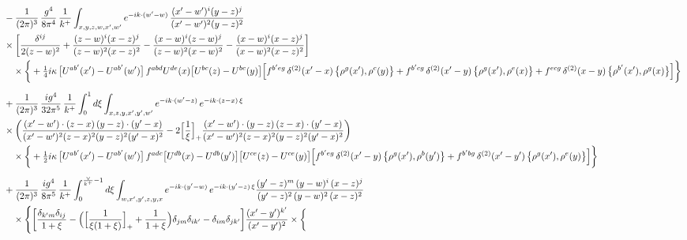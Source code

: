 \documentclass[10pt]{article}
\numberwithin{equation}{section}
\begin{document}
\begin{align}
&-\frac{1}{(2\pi)^{3}}\,\frac{g^{4}}{8\pi^{4}}\,\frac{1}{k^{+}}\int_{x,y,z,w,x^{\prime},w^{\prime}}e^{-ik\cdot(w^{\prime}-w)}\,\frac{(x^{\prime}-w^{\prime})^{i}(y-z)^{j}}{(x^{\prime}-w^{\prime})^{2}(y-z)^{2}}\notag\\
&\times\bigg[\frac{\delta^{ij}}{2(z-w)^{2}}+\frac{(z-w)^{i}(x-z)^{j}}{(z-w)^{2}(x-z)^{2}}-\frac{(x-w)^{i}(z-w)^{j}}{(z-w)^{2}(x-w)^{2}}-\frac{(x-w)^{i}(x-z)^{j}}{(x-w)^{2}(x-z)^{2}}\bigg]\notag\\
&\quad\times\bigg\{+\tfrac14 i\kappa\,\big[U^{ab^{\prime}}(x^{\prime})-U^{ab^{\prime}}(w^{\prime})\big]\,f^{abd}U^{de}(x)\big[U^{bc}(z)-U^{bc}(y)\big]\Big[f^{b^{\prime}eg}\,\delta^{(2)}(x^{\prime}-x)\,\big\{\rho^{g}(x^{\prime}),\rho^{c}(y)\big\}+f^{b^{\prime}cg}\,\delta^{(2)}(x^{\prime}-y)\,\big\{\rho^{g}(x^{\prime}),\rho^{e}(x)\big\}+f^{ecg}\,\delta^{(2)}(x-y)\,\big\{\rho^{b^{\prime}}(x^{\prime}),\rho^{g}(x)\big\}\Big]\bigg\}\notag\\[6pt]
&+\frac{1}{(2\pi)^{3}}\,\frac{ig^{4}}{32\pi^{5}}\,\frac{1}{k^{+}}\int_{0}^{1}d\xi\int_{x,z,y,x^{\prime},y^{\prime},w^{\prime}}e^{-ik\cdot(w^{\prime}-z)}\,e^{-ik\cdot(z-x)\,\xi}\notag\\
&\times\bigg(\frac{(x^{\prime}-w^{\prime})\cdot(z-x)\,(y-z)\cdot(y^{\prime}-x)}{(x^{\prime}-w^{\prime})^{2}(z-x)^{2}(y-z)^{2}(y^{\prime}-x)^{2}}-2\Big[\frac{1}{\xi}\Big]_{+}\frac{(x^{\prime}-w^{\prime})\cdot(y-z)\,(z-x)\cdot(y^{\prime}-x)}{(x^{\prime}-w^{\prime})^{2}(z-x)^{2}(y-z)^{2}(y^{\prime}-x)^{2}}\bigg)\notag\\
&\quad\times\bigg\{+\tfrac12 i\kappa\,\big[U^{ab^{\prime}}(x^{\prime})-U^{ab^{\prime}}(w^{\prime})\big]\,f^{adc}\big[U^{db}(x)-U^{db}(y^{\prime})\big]\big[U^{ce}(z)-U^{ce}(y)\big]\Big[f^{b^{\prime}eg}\,\delta^{(2)}(x^{\prime}-y)\,\big\{\rho^{g}(x^{\prime}),\rho^{b}(y^{\prime})\big\}+f^{b^{\prime}bg}\,\delta^{(2)}(x^{\prime}-y^{\prime})\,\big\{\rho^{g}(x^{\prime}),\rho^{e}(y)\big\}\Big]\bigg\}\notag\\[6pt]
&+\frac{1}{(2\pi)^{3}}\,\frac{ig^{4}}{8\pi^{5}}\,\frac{1}{k^{+}}\int_{0}^{\frac{\vee}{k^{+}}-1}d\xi\int_{w,x^{\prime},y^{\prime},z,y,x}e^{-ik\cdot(y^{\prime}-w)}\,e^{-ik\cdot(y^{\prime}-z)\,\xi}\frac{(y^{\prime}-z)^{m}\,(y-w)^{i}\,(x-z)^{j}}{(y^{\prime}-z)^{2}\,(y-w)^{2}\,(x-z)^{2}}\notag\\
&\quad\times\Bigg\{\bigg[\frac{\delta_{k^{\prime}m}\delta_{ij}}{1+\xi}-\Big(\Big[\frac{1}{\xi(1+\xi)}\Big]_{+}+\frac{1}{1+\xi}\Big)\delta_{jm}\delta_{ik^{\prime}}-\delta_{im}\delta_{jk^{\prime}}\bigg]\frac{(x^{\prime}-y^{\prime})^{k^{\prime}}}{(x^{\prime}-y^{\prime})^{2}}\times\bigg\{\notag\\

\end{align}
\end{document}

